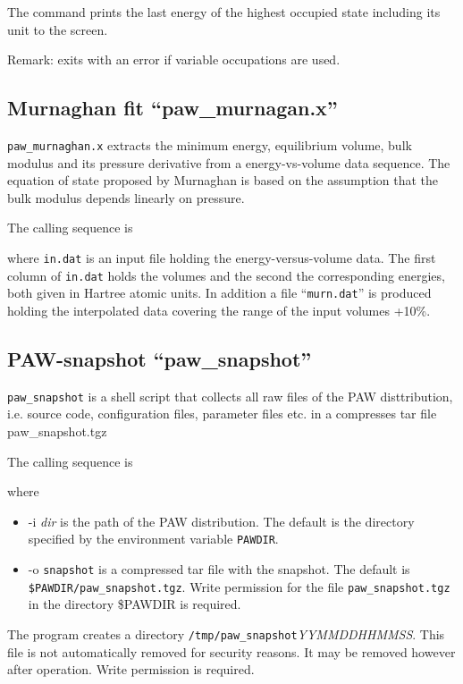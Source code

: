 \documentclass[final,12pt]{article}
\begin{document}
{{{\bigskip{}

The command prints the last energy of the highest occupied state
including its unit to the screen.

Remark: exits with an error if variable occupations are used.

\subsection{Murnaghan fit ``paw\_murnagan.x''}
{\tt paw\_murnaghan.x} extracts the minimum energy, equilibrium
volume, bulk modulus and its pressure derivative from a
energy-vs-volume data sequence. The equation of state proposed by
Murnaghan\cite{murnaghan44_pnas30_244} is based on the assumption that
the bulk modulus depends linearly on pressure.

The calling sequence is

\bigskip{}\bigskip

where {\tt in.dat} is an input file holding the energy-versus-volume
data.  The first column of {\tt in.dat} holds the volumes and the
second the corresponding energies, both given in Hartree atomic
units. In addition a file ``{\tt murn.dat}'' is produced holding the
interpolated data covering the range of the input volumes +10\%.

\subsection{PAW-snapshot ``paw\_snapshot''}
{\tt paw\_snapshot} is a shell script that collects all raw files of
the PAW disttribution, i.e. source code, configuration files,
parameter files etc. in a compresses tar file paw\_snapshot.tgz

The calling sequence is

\bigskip{}
\bigskip

where 
\begin{itemize}
\item -i \textit{dir} is the path of the PAW distribution. The default
  is the directory specified by the environment variable
  \texttt{PAWDIR}.
\item -o \texttt{snapshot} is a compressed tar file with the
  snapshot. The default is \texttt{\$PAWDIR/paw\_snapshot.tgz}.  Write
  permission for the file \texttt{paw\_snapshot.tgz} in the directory
  \$PAWDIR is required.  
\end{itemize}
The program creates a directory
\texttt{/tmp/paw\_snapshot}\textit{YYMMDDHHMMSS}. This file is not
automatically removed for security reasons. It may be removed however
after operation. Write permission is required.


}}}
\end{document}
